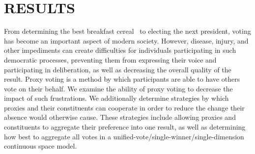 \documentclass[cs,msthesis]{usuthesis}
\begin{document}
    

    \body  %
    \chapter{RESULTS}\label{ch:results}
    \thispagestyle{empty}
    From determining the best breakfast cereal~\cite{Curtis2021} to electing the next
    president, voting has become an important aspect of modern society.
    However, disease, injury, and other impediments can create difficulties for individuals
    participating in such democratic processes, preventing them from expressing their
    voice and participating in deliberation, as well as decreasing the overall quality of
    the result.
    Proxy voting is a method by which participants are able to have others vote on their
    behalf.
    We examine the ability of proxy voting to decrease the impact of such frustrations.
    We additionally determine strategies by which proxies and their constituents can
    cooperate in order to reduce the change their absence would otherwise cause.
    These strategies include allowing proxies and constituents to aggregate their
    preference into one result, as well as determining how best to aggregate all votes in
    a unified-vote/single-winner/single-dimension continuous space model.

    
    
    
    
    

    
\end{document}
